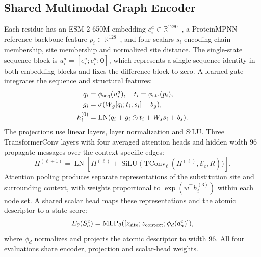 \subsection{Shared Multimodal Graph Encoder}
Each residue has an ESM-2 650M embedding $e_i^a\in\mathbb{R}^{1280}$~\cite{esm2},
a ProteinMPNN reference-backbone feature $p_i\in\mathbb{R}^{128}$~\cite{proteinmpnn},
and four scalars $s_i$ encoding chain membership, site membership and
normalized site distance. The single-state sequence block is
$u_i^a=[e_i^a;e_i^a;\mathbf{0}]$, which represents a single sequence identity
in both embedding blocks and fixes the difference block to zero.
A learned gate integrates the sequence and structural features:
\begin{align}
 q_i&=\phi_{\rm seq}(u_i^a),\quad t_i=\phi_{\rm str}(p_i),\nonumber\\
 g_i&=\sigma(W_g[q_i;t_i;s_i]+b_g),\nonumber\\
 h_i^{(0)}&=\operatorname{LN}(q_i+g_i\odot t_i+W_s s_i+b_s).
\end{align}
The projections use linear layers, layer normalization and SiLU. Three
TransformerConv layers with four averaged attention heads and hidden width
96 propagate messages over the context-specific edges:
\begin{equation}
 H^{(\ell+1)}=\operatorname{LN}\!\left[H^{(\ell)}+
 \operatorname{SiLU}\big(\operatorname{TConv}_{\ell}
 (H^{(\ell)},\mathcal E_c,R)\big)\right].
\end{equation}
Attention pooling produces separate representations of the substitution
site and surrounding context, with weights proportional to
$\exp(w^\top h_i^{(3)})$ within each node set. A shared scalar head maps these
representations and the atomic descriptor to a state score:
\begin{equation}
 E_\theta(S_a^c)=\operatorname{MLP}_\theta
 ([z_{\rm site};z_{\rm context};\phi_d(d_a^c)]),
\end{equation}
where $\phi_d$ normalizes and projects the atomic descriptor to width 96.
All four evaluations share encoder, projection and scalar-head weights.

